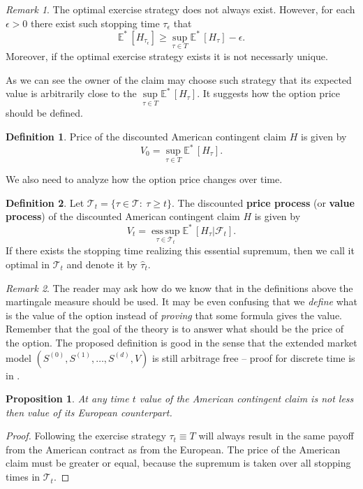\documentclass[a4paper,11pt, twoside]{book}
\newtheorem{prop}[thm]{Proposition}
\theoremstyle{definition}
\newtheorem{mydef}{Definition}[chapter]
\theoremstyle{remark}
\newtheorem{remark}{Remark}[chapter]
\def\Em{{\mathbb{E}^*}\,}
\DeclareMathOperator*{\esssup}{ess\,sup}
\begin{document}
\begin{remark}
 The optimal exercise strategy does not always exist. However, for each $\epsilon > 0$ there exist such stopping time $\tau_\epsilon$ that
 \[ \Em[H_{\tau_\epsilon}] \geq \sup\limits_{\tau \in T} \Em[H_{\tau}] - \epsilon.\]
 Moreover, if the optimal exercise strategy exists it is not necessarly unique.
\end{remark}
As we can see the owner of the claim may choose such strategy that its expected value is arbitrarily close to the $\sup\limits_{\tau \in T} \Em[H_{\tau}]$. It suggests how the option price should be defined.
\begin{mydef}
 Price of the discounted American contingent claim $H$ is given by
\begin{equation}
\label{eq:AM_optPrice}
V_0 = \sup\limits_{\tau \in T} \Em[H_{\tau}]. 
\end{equation}
\end{mydef}
We also need to analyze how the option price changes over time.
\begin{mydef}
 \label{def:valueProcess}
 Let  $\mathcal{T}_t = \{ \tau \in \mathcal{T}:\ \tau \geq t \}$. The discounted \textbf{price process} (or \textbf{value process}) of the  discounted American contingent claim $H$ is given by
\begin{equation}
\label{eq:AM_valueProcess}
V_t = \esssup\limits_{\tau \in  \mathcal{T}_t} \Em[H_{\tau} | \mathcal{F}_t]. 
\end{equation}
 If there exists the stopping time realizing this essential supremum, then we call it optimal in $\mathcal{T}_t$ and denote it by $\hat{\tau}_t$.
\end{mydef}

\begin{remark}
 The reader may ask how do we know that in the definitions above the martingale measure should be used. It may be even confusing that we \emph{define} what is the value of the option instead of \emph{proving} that some formula gives the value. Remember that the goal of the theory is to answer what should be the price of the option. The proposed definition is good in the sense that the extended market model $(S^{(0)}, S^{(1)}, \ldots, S^{(d)}, V)$ is still arbitrage free -- proof for discrete time is in \cite{follmer}.
\end{remark}


\begin{prop}
 At any time $t$ value of the American contingent claim is not less then value of its European counterpart.
\end{prop}
\begin{proof}
 Following the exercise strategy $\tau_t \equiv T$ will always result in the same payoff from the American contract as from the European. The price of the American claim must be greater or equal, because the supremum is taken over all stopping times in $\mathcal{T}_t$.
\end{proof}
\end{document}
